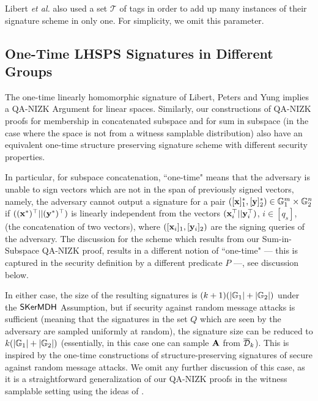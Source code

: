 Libert \textit{et al.} also used a set $\mathcal{T}$ of tags in order to add up many instances of their signature scheme
in only one. For simplicity, we omit this parameter.


\subsection{One-Time LHSPS Signatures in Different Groups} \label{sec:newhomtwogroups}

The one-time linearly homomorphic signature of Libert, Peters and Yung \cite{EC:LPJY14}  implies a QA-NIZK Argument for linear spaces. Similarly, our constructions of QA-NIZK proofs for membership in concatenated subspace and for sum in subspace (in the case where the space is not from a witness samplable distribution) also have an equivalent one-time structure preserving signature scheme with different security properties. 

In particular, for subspace concatenation, ``one-time" means that the adversary is unable to sign vectors which are not in the span of previously signed vectors, namely,
the adversary cannot output a signature for a pair
$([\mathbf{x}]_1^*,[\mathbf{y}]_2^*) \in \mathbb{G}_1^{m} \times \mathbb{G}_2^{n}$ if $((\mathbf{x}^*)^{\top}||(\mathbf{y}^*)^{\top})$ is
linearly independent from the 
vectors $(\mathbf{x}_i^{\top}||\mathbf{y}_i^{\top})$, $i \in [q_s]$, (the concatenation of two vectors), where $([\mathbf{x}_i]_1,[\mathbf{y}_i]_2)$ are the signing queries of the adversary. The discussion for the scheme which results from our 
Sum-in-Subspace QA-NIZK proof, results in a different notion of ``one-time" --- this is captured in the security definition by a different predicate $P$ ---, see discussion below. 

In either case, the size of the resulting signatures is $(k+1)(|\mathbb{G}_1|+|\mathbb{G}_2|)$ under the $\mathsf{SKerMDH}$ Assumption, but if security against random message attacks is sufficient (meaning that the signatures in the set $Q$ which are seen by the adversary are sampled uniformly at random), the signature size can be reduced to $k(|\mathbb{G}_1|+|\mathbb{G}_2|)$ (essentially, in this case one can sample $\mathbf{{A}}$ from $\overline{\mathcal{D}}_k$). This is inspired by the one-time constructions of structure-preserving signatures of \cite{C:KilPanWee15} secure against random message attacks. 
 We omit any further discussion of this case, as it is a straightforward generalization of our QA-NIZK proofs in the witness samplable setting using the ideas of \cite{C:KilPanWee15}. 




